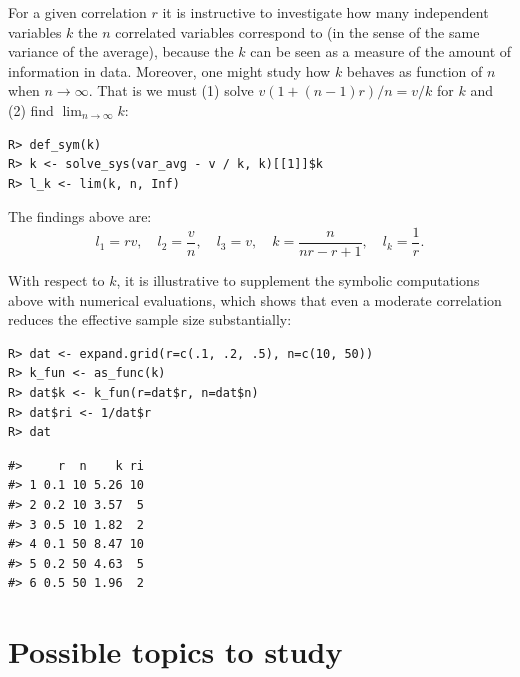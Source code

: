For a given correlation \(r\) it is instructive to investigate how many
independent variables \(k\) the \(n\) correlated variables correspond to
(in the sense of the same variance of the average), because the \(k\)
can be seen as a measure of the amount of information in data.
Moreover, one might study how \(k\) behaves as function of \(n\)
when \(n \rightarrow \infty\).
That is we must (1) solve \(v (1 + (n-1)r)/n = v/k\) for \(k\)
and (2) find \(\lim_{n\rightarrow\infty} k\):

\begin{verbatim}
R> def_sym(k)
R> k <- solve_sys(var_avg - v / k, k)[[1]]$k
R> l_k <- lim(k, n, Inf)
\end{verbatim}

The findings above are:
\[
l_1 = r v, \quad
l_2 = \frac{v}{n}, \quad
l_3 = v, \quad
k = \frac{n}{n r - r + 1}, \quad 
l_k = \frac{1}{r} .
\]

With respect to \(k\), it is illustrative to supplement the symbolic
computations above with numerical evaluations, which shows that
even a moderate correlation reduces the effective sample size substantially:

\begin{verbatim}
R> dat <- expand.grid(r=c(.1, .2, .5), n=c(10, 50))
R> k_fun <- as_func(k)
R> dat$k <- k_fun(r=dat$r, n=dat$n)
R> dat$ri <- 1/dat$r
R> dat
\end{verbatim}

\begin{verbatim}
#>     r  n    k ri
#> 1 0.1 10 5.26 10
#> 2 0.2 10 3.57  5
#> 3 0.5 10 1.82  2
#> 4 0.1 50 8.47 10
#> 5 0.2 50 4.63  5
#> 6 0.5 50 1.96  2
\end{verbatim}

\hypertarget{possible-topics-to-study}{%
\section{Possible topics to study}\label{possible-topics-to-study}}


